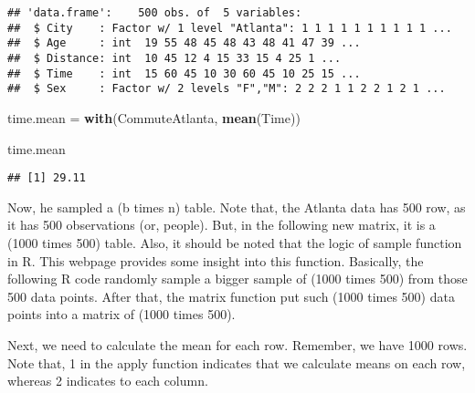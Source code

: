 \documentclass[]{book}
\newenvironment{Shaded}{\begin{snugshade}}{\end{snugshade}}
\newcommand{\DataTypeTok}[1]{\textcolor[rgb]{0.13,0.29,0.53}{#1}}
\newcommand{\DecValTok}[1]{\textcolor[rgb]{0.00,0.00,0.81}{#1}}
\newcommand{\KeywordTok}[1]{\textcolor[rgb]{0.13,0.29,0.53}{\textbf{#1}}}
\newcommand{\NormalTok}[1]{#1}
\newcommand{\OperatorTok}[1]{\textcolor[rgb]{0.81,0.36,0.00}{\textbf{#1}}}
\newcommand{\OtherTok}[1]{\textcolor[rgb]{0.56,0.35,0.01}{#1}}
\newcommand{\StringTok}[1]{\textcolor[rgb]{0.31,0.60,0.02}{#1}}
\begin{document}
\begin{verbatim}
## 'data.frame':    500 obs. of  5 variables:
##  $ City    : Factor w/ 1 level "Atlanta": 1 1 1 1 1 1 1 1 1 1 ...
##  $ Age     : int  19 55 48 45 48 43 48 41 47 39 ...
##  $ Distance: int  10 45 12 4 15 33 15 4 25 1 ...
##  $ Time    : int  15 60 45 10 30 60 45 10 25 15 ...
##  $ Sex     : Factor w/ 2 levels "F","M": 2 2 2 1 1 2 2 1 2 1 ...
\end{verbatim}

\begin{Shaded}
\begin{Highlighting}[]
\NormalTok{time.mean =}\StringTok{ }\KeywordTok{with}\NormalTok{(CommuteAtlanta, }\KeywordTok{mean}\NormalTok{(Time))}

\NormalTok{time.mean}
\end{Highlighting}
\end{Shaded}

\begin{verbatim}
## [1] 29.11
\end{verbatim}

Now, he sampled a (b times n) table. Note that, the Atlanta data has 500 row, as it has 500 observations (or, people). But, in the following new matrix, it is a (1000 times 500) table. Also, it should be noted that the logic of sample function in R. This webpage provides some insight into this function. Basically, the following R code randomly sample a bigger sample of (1000 times 500) from those 500 data points. After that, the matrix function put such (1000 times 500) data points into a matrix of (1000 times 500).

\begin{Shaded}
\end{Shaded}

Next, we need to calculate the mean for each row. Remember, we have 1000 rows. Note that, 1 in the apply function indicates that we calculate means on each row, whereas 2 indicates to each column.
\end{document}
